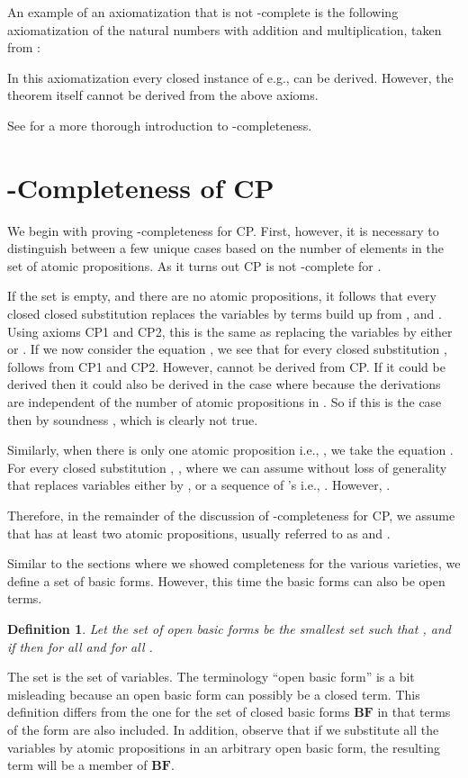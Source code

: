 \documentclass[a4paper,twoside,openright]{report}
\newcommand{\BF}{\ensuremath{\textbf{BF}}}
\newtheorem{defn}[theorem]{Definition}
\begin{document}
An example of an axiomatization that is not -complete is the following axiomatization of the natural numbers with addition and multiplication, taken from \cite{omega_bergstra}:

In this axiomatization every closed instance of e.g.,  can be derived. However, the theorem itself cannot be derived from the above axioms.

See \cite{omega} for a more thorough introduction to -completeness.

\section{-Completeness of CP}

We begin with proving -completeness for CP. First, however, it is necessary to distinguish between a few unique cases based on the number of elements in the set  of atomic propositions. As it turns out CP is not -complete for .

If the set  is empty, and there are no atomic propositions, it follows that every closed closed substitution  replaces the variables by terms build up from ,  and . Using axioms CP1 and CP2, this is the same as replacing the variables by either  or . If we now consider the equation , we see that for every closed substitution ,  follows from CP1 and CP2. However,  cannot be derived from CP. If it could be derived then it could also be derived in the case where  because the derivations are independent of the number of atomic propositions in . So if this is the case then by soundness , which is clearly not true.

Similarly, when there is only one atomic proposition i.e., , we take the equation . For every closed substitution , , where we can assume without loss of generality that  replaces variables either by ,  or a sequence of 's i.e., .  However, .

Therefore, in the remainder of the discussion of -completeness for CP, we assume that  has at least two atomic propositions, usually referred to as  and .

Similar to the sections where we showed completeness for the various varieties, we define a set of basic forms. However, this time the basic forms can also be open terms.
\begin{defn}\label{open basic form def}
Let the set of open basic forms  be the smallest set such that , and if  then  for all  and  for all .
\end{defn}
The set  is the set of variables. The terminology ``open basic form'' is a bit misleading because an open basic form can possibly be a closed term. This definition differs from the one for the set of closed basic forms \BF{} in that terms of the form  are also included. In addition, observe that if we substitute all the variables by atomic propositions in an arbitrary open basic form, the resulting term will be a member of \BF.
\end{document}
